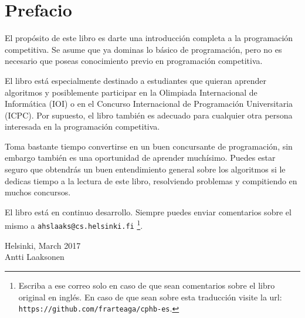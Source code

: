 \chapter*{Prefacio}

El prop\'osito de este libro es darte
una introducci\'on completa a la programaci\'on competitiva.
Se asume que ya dominas lo b\'asico de programaci\'on, pero no
es necesario que poseas conocimiento previo en programaci\'on
competitiva.

El libro est\'a especialmente destinado a estudiantes que
quieran aprender algoritmos y posiblemente participar en
la Olimpiada Internacional de Inform\'atica (IOI) o en el
Concurso Internacional de Programaci\'on Universitaria (ICPC).
Por supuesto, el libro tambi\'en es adecuado para
cualquier otra persona interesada en la programaci\'on 
competitiva.

Toma bastante tiempo convertirse en un buen concursante de
programaci\'on, sin embargo tambi\'en es una oportunidad de
aprender much\'isimo. Puedes estar seguro que obtendr\'as un
buen entendimiento general sobre los algoritmos si le
dedicas tiempo a la lectura de este libro, resolviendo
problemas y compitiendo en muchos concursos.

El libro est\'a en continuo desarrollo. Siempre
puedes enviar comentarios sobre el mismo
a \texttt{ahslaaks@cs.helsinki.fi} \footnote{Escriba a ese
correo solo en caso de que sean comentarios sobre el
libro original en ingl\'es. En caso de que sean sobre esta
traducci\'on visite la url: \texttt{https://github.com/frarteaga/cphb-es}.}.

\begin{flushright}
Helsinki, March 2017 \\
Antti Laaksonen
\end{flushright}
